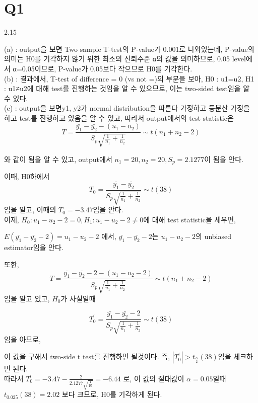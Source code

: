 \documentclass{article}
\begin{document}
\pagestyle{fancy}


\section{Q1} 
2.15

(a) : output을 보면 Two sample T-test의 P-value가 0.001로 나와있는데, P-value의 의미는 
    H0를 기각하지 않기 위한 최소의 신뢰수준 α의 값을 의미하므로,
    0.05 level에서 α=0.05이므로, P-value가 0.05보다 작으므로 H0를 기각한다. \\

(b) : 결과에서, T-test of difference = 0 (vs not =)의 부분을 보아, H0 : u1=u2, H1 : u1≠u2에 대해
     test를 진행하는 것임을 알 수 있으므로, 이는 two-sided test임을 알 수 있다. \\

(c) : output을 보면y1, y2가 normal distribution을 따른다 가정하고 등분산 가정을 하고 test를 진행하고 있음을 알 수 있고, 따라서 output에서의 test statistic은
$$ T = \frac{\bar{y_1} - \bar{y_2} - (u_1 - u_2)}{S_p \sqrt{\frac{1}{n_1} + \frac{1}{n_2}}}  \sim t(n_1 + n_2 - 2)$$

와 같이 됨을 알 수 있고, output에서 $n_1 = 20 , n_2 = 20, S_p = 2.1277$이 됨을 안다.

이때, H0하에서 $$ T_0 = \frac{\bar{y_1} - \bar{y_2}}{S_p \sqrt{\frac{1}{n_1} + \frac{1}{n_2}}}  \sim t(38) $$ 임을 알고,
이때의 $T_0 = -3.47$임을 안다. \\

이제, $H_0 : u_1 - u_2 - 2 = 0, H_1 : u_1 - u_2 - 2 \neq 0 $에 대해 test statistic을 세우면,

$E(\bar{y_1} - \bar{y_2} - 2) = u_1 - u_2 - 2$ 에서, $\bar{y_1} - \bar{y_2} - 2$는 $u_1 - u_2 - 2$의 unbiased estimator임을 안다.

또한,
$$ T = \frac{\bar{y_1} - \bar{y_2} - 2 - (u_1 - u_2 - 2)}{S_p \sqrt{\frac{1}{n_1} + \frac{1}{n_2}}}  \sim t(n_1 + n_2 - 2)$$
임을 알고 있고, $H_0$가 사실일때 

$$ T_0^{'} = \frac{\bar{y_1} - \bar{y_2} - 2}{S_p \sqrt{\frac{1}{n_1} + \frac{1}{n_2}}}  \sim t(38) $$ 임을 아므로,

이 값을 구해서 two-side t test를 진행하면 될것이다. 즉, $|T_0^{'}| > t_{\frac{\alpha}{2}}(38) $임을 체크하면 된다.  \\

따라서 $ T_0^{'} = -3.47 - \frac{2}{2.1277 \sqrt{\frac{1}{10}}} = -6.44 $ 로, 
이 값의 절대값이 $\alpha = 0.05$일때  $ t_{0.025}(38) =  2.02$ 보다 크므로, H0를 기각하게 된다. \\
\end{document}

